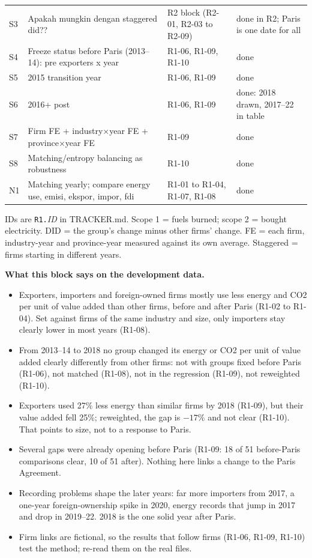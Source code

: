 {\begin{tabularx}{\linewidth}{@{}l X p{4.3cm} p{4.6cm}@{}}
S3 & Apakah mungkin dengan staggered did?? & R2 block (R2-01, R2-03 to R2-09) & done in R2; Paris is one date for all \\
S4 & Freeze status before Paris (2013--14): pre exporters x year & R1-06, R1-09, R1-10 & done \\
S5 & 2015 transition year & R1-06, R1-09 & done \\
S6 & 2016+ post & R1-06, R1-09 & done: 2018 drawn, 2017--22 in table \\
S7 & Firm FE + industry$\times$year FE + province$\times$year FE & R1-09 & done \\
S8 & Matching/entropy balancing as robustness & R1-10 & done \\
N1 & Matching yearly; compare energy use, emisi, ekspor, impor, fdi & R1-01 to R1-04, R1-07, R1-08 & done \\
\bottomrule
\end{tabularx}\par}
{\scriptsize\color{soft}IDs are \texttt{R1.}\emph{ID} in TRACKER.md. Scope 1 = fuels burned; scope 2 = bought electricity. DID = the group's change
minus other firms' change. FE = each firm, industry-year and province-year measured against its own average. Staggered = firms
starting in different years.\par}

\medskip
{\small\textbf{What this block says on the development data.}
\begin{itemize}
\item Exporters, importers and foreign-owned firms mostly use less energy and CO2 per unit of value added than other firms,
  before and after Paris (R1-02 to R1-04). Set against firms of the same industry and size, only importers stay clearly lower in most years (R1-08).
\item From 2013--14 to 2018 no group changed its energy or CO2 per unit of value added clearly differently from other firms:
  not with groups fixed before Paris (R1-06), not matched (R1-08), not in the regression (R1-09), not reweighted (R1-10).
\item Exporters used 27\% less energy than similar firms by 2018 (R1-09), but their value added fell 25\%; reweighted, the gap is
  $-17$\% and not clear (R1-10). That points to size, not to a response to Paris.
\item Several gaps were already opening before Paris (R1-09: 18 of 51 before-Paris comparisons clear, 10 of 51 after).
  Nothing here links a change to the Paris Agreement.
\item Recording problems shape the later years: far more importers from 2017, a one-year foreign-ownership spike in 2020,
  energy records that jump in 2017 and drop in 2019--22. 2018 is the one solid year after Paris.
\item Firm links are fictional, so the results that follow firms (R1-06, R1-09, R1-10) test the method; re-read them on the real files.
\end{itemize}}

